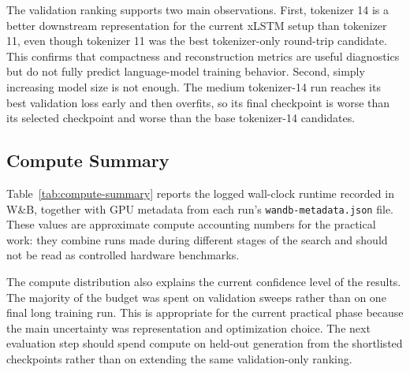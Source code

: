 The validation ranking supports two main observations. First, tokenizer 14 is a
better downstream representation for the current xLSTM setup than tokenizer 11,
even though tokenizer 11 was the best tokenizer-only round-trip candidate. This
confirms that compactness and reconstruction metrics are useful diagnostics but
do not fully predict language-model training behavior. Second, simply increasing
model size is not enough. The medium tokenizer-14 run reaches its best validation
loss early and then overfits, so its final checkpoint is worse than its selected
checkpoint and worse than the base tokenizer-14 candidates.

\subsection{Compute Summary}

Table~\ref{tab:compute-summary} reports the logged wall-clock runtime recorded
in W\&B, together with GPU metadata from each run's \verb|wandb-metadata.json|
file. These values are approximate compute accounting numbers for the practical
work: they combine runs made during different stages of the search and should
not be read as controlled hardware benchmarks.

\begin{table}[htbp]
	\centering
	\small
	\caption{Approximate compute used by completed xLSTM experiments, aggregated from W\&B runtime summaries and run metadata.}
	\label{tab:compute-summary}
\end{table}

The compute distribution also explains the current confidence level of the
results. The majority of the budget was spent on validation sweeps rather than
on one final long training run. This is appropriate for the current practical
phase because the main uncertainty was representation and optimization choice.
The next evaluation step should spend compute on held-out generation from the
shortlisted checkpoints rather than on extending the same validation-only
ranking.
